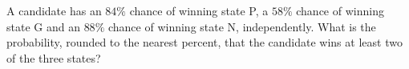 A candidate has an $84\%$ chance of winning state P, a $58\%$ chance of winning state G and an $88\%$ chance of winning state N, independently. What is the probability, rounded to the nearest percent, that the candidate wins at least two of the three states?
